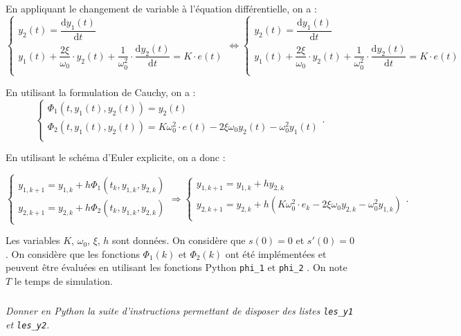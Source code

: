 \documentclass[10pt,fleqn]{article} %
\begin{document}
\ifprof
\begin{corrige}
En appliquant le changement de variable à l'équation différentielle, on a :
$$
\left\{ 
\begin{array}{l}
y_2(t)=\dfrac{\text{d}y_1(t)}{\text{d}t} \\
y_1(t)
+\dfrac{2\xi}{\omega_0}\cdot y_2(t)
+\dfrac{1}{\omega_0^2}\cdot \dfrac{\text{d}y_2(t)}{\text{d}t}
= K\cdot e(t) \\
\end{array}
\right.
\Leftrightarrow 
\left\{ 
\begin{array}{l}
y_2(t)=\dfrac{\text{d}y_1(t)}{\text{d}t} \\
y_1(t)
+\dfrac{2\xi}{\omega_0}\cdot y_2(t)
+\dfrac{1}{\omega_0^2}\cdot \dfrac{\text{d}y_2(t)}{\text{d}t}
= K\cdot e(t) \\
\end{array}
\right.
$$

En utilisant la formulation de Cauchy, on a :
$$
\left\{ 
\begin{array}{l}
\Phi_1(t,y_1(t),y_2(t))=y_2(t)\\
\Phi_2(t,y_1(t),y_2(t))=K\omega_0^2\cdot e(t) - 2\xi \omega_0  y_2(t) -\omega_0^2y_1(t)\\
\end{array}
\right.
.
$$

En utilisant le schéma d'Euler explicite, on a donc : 

$$
\left\{ 
\begin{array}{l}
y_{1,k+1}=y_{1,k}+h \Phi_1(t_k,y_{1,k},y_{2,k}) \\
y_{2,k+1}=y_{2,k}+h \Phi_2(t_k,y_{1,k},y_{2,k}) \\
\end{array}
\right.
\Rightarrow
\left\{ 
\begin{array}{l}
y_{1,k+1}=y_{1,k}+h y_{2,k} \\
y_{2,k+1}=y_{2,k}+h \left( K\omega_0^2\cdot e_k - 2\xi \omega_0  y_{2,k} -\omega_0^2y_{1,k}\right) \\
\end{array}
\right.
.
$$
\end{corrige}
\else
\fi

Les variables $K$, $\omega_0$, $\xi$, $h$ sont données. On considère que $s(0)=0$ et $s'(0)=0$. On considère que les fonctions $\Phi_1(k)$ et $\Phi_2(k)$ ont été implémentées et peuvent être évaluées en utilisant les fonctions Python \texttt{phi\_1} et \texttt{phi\_2} . On note $T$ le temps de simulation.


\subparagraph{}
\textit{Donner en Python la suite d'instructions permettant de disposer des listes \texttt{les\_y1} et \texttt{les\_y2}.}
\end{document}
